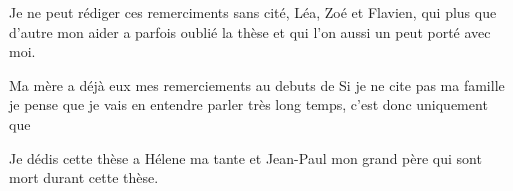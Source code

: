 \documentclass[main.tex]{subfiles}
\begin{document}
Je ne peut rédiger ces remerciments sans cité, Léa, Zoé et Flavien, qui plus que d'autre mon aider a parfois oublié la thèse et qui l'on aussi un peut porté avec moi.

Ma mère a déjà eux mes remerciements au debuts de  Si je ne cite pas ma famille je pense que je vais en entendre parler très long temps, c'est donc uniquement que  



Je dédis cette thèse a Hélene ma tante et Jean-Paul mon grand père qui sont mort durant cette thèse.
\end{document}
